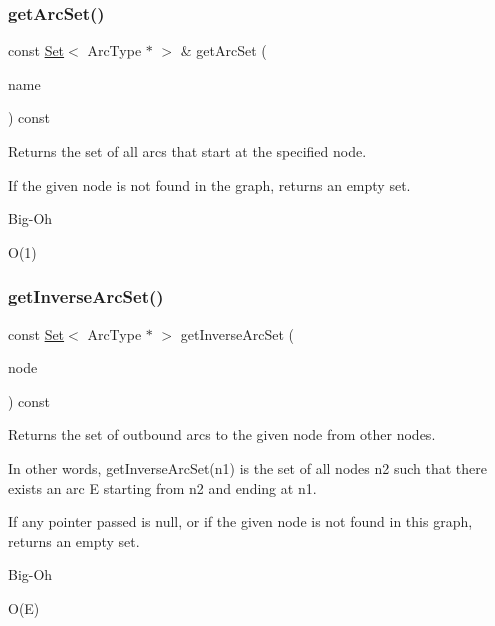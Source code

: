 \subsubsection{\texorpdfstring{get\+Arc\+Set()}{getArcSet()}\hspace{0.1cm}{\footnotesize\ttfamily [3/3]}}
{\footnotesize\ttfamily const \mbox{\hyperlink{classstanfordcpplib_1_1collections_1_1GenericSet}{Set}}$<$ Arc\+Type $\ast$ $>$ \& get\+Arc\+Set (\begin{DoxyParamCaption}\item[{const std\+::string \&}]{name }\end{DoxyParamCaption}) const}



Returns the set of all arcs that start at the specified node. 

If the given node is not found in the graph, returns an empty set. \begin{DoxyRefDesc}{Big-\/\+Oh}
\item[\mbox{\hyperlink{BigOh__BigOh000064}{Big-\/\+Oh}}]O(1) \end{DoxyRefDesc}
\mbox{\label{classGraph_ad5fd149800cd46aae497b05b46059b63}} 
\subsubsection{\texorpdfstring{get\+Inverse\+Arc\+Set()}{getInverseArcSet()}\hspace{0.1cm}{\footnotesize\ttfamily [1/2]}}
{\footnotesize\ttfamily const \mbox{\hyperlink{classstanfordcpplib_1_1collections_1_1GenericSet}{Set}}$<$ Arc\+Type $\ast$ $>$ get\+Inverse\+Arc\+Set (\begin{DoxyParamCaption}\item[{Node\+Type $\ast$}]{node }\end{DoxyParamCaption}) const}



Returns the set of outbound arcs to the given node from other nodes. 

In other words, get\+Inverse\+Arc\+Set(n1) is the set of all nodes n2 such that there exists an arc E starting from n2 and ending at n1.

If any pointer passed is null, or if the given node is not found in this graph, returns an empty set. \begin{DoxyRefDesc}{Big-\/\+Oh}
\item[\mbox{\hyperlink{BigOh__BigOh000065}{Big-\/\+Oh}}]O(\+E) \end{DoxyRefDesc}
\mbox{\label{classGraph_a2cfe12e71ca594736a1e329461cff024}} 
